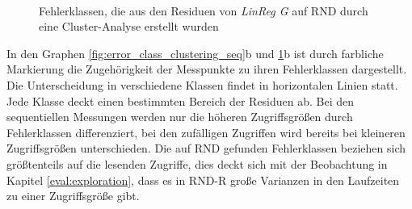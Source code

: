 \documentclass[
	12pt,
	a4paper,
	BCOR10mm,
	DIV14,
	listof=totoc,
	bibliography=totoc,
	headsepline
]{scrreprt}
\begin{document}
\begin{figure}[b!]
	\centering
	\hfill
	\\
	\hfill
	\vspace*{-0.3cm}
	\caption{Fehlerklassen, die aus den Residuen von \textit{LinReg G} auf RND durch eine Cluster-Analyse erstellt wurden}
	\label{fig:error_class_clustering_rnd}
\end{figure} \medskip

In den Graphen \ref{fig:error_class_clustering_seq}b und \ref{fig:error_class_clustering_rnd}b ist durch farbliche Markierung die Zugehörigkeit der Messpunkte zu ihren Fehlerklassen dargestellt.
Die Unterscheidung in verschiedene Klassen findet in horizontalen Linien statt.
Jede Klasse deckt einen bestimmten Bereich der Residuen ab.
Bei den sequentiellen Messungen werden nur die höheren Zugriffsgrößen durch Fehlerklassen differenziert, bei den zufälligen Zugriffen wird bereits bei kleineren Zugriffsgrößen unterschieden. Die auf RND gefunden Fehlerklassen beziehen sich größtenteils auf die lesenden Zugriffe, dies deckt sich mit der Beobachtung in Kapitel \ref{eval:exploration}, dass es in RND-R große Varianzen in den Laufzeiten zu einer Zugriffsgröße gibt.\medskip
\end{document}
